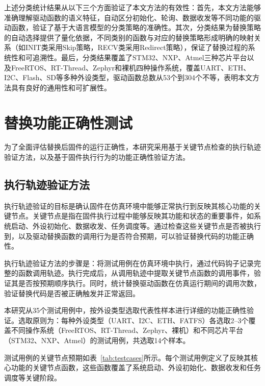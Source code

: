 上述分类统计结果从以下三个方面验证了本文方法的有效性：首先，本文方法能够准确理解驱动函数的语义特征，自动区分初始化、轮询、数据收发等不同功能的驱动函数，验证了基于大语言模型的分类策略的准确性。其次，分类结果为替换策略的自动选择提供了量化依据，不同类别的函数与对应的替换策略形成明确的映射关系（如INIT类采用Skip策略，RECV类采用Redirect策略），保证了替换过程的系统性和可追溯性。最后，分类结果覆盖了STM32、NXP、Atmel三种芯片平台以及FreeRTOS、RT-Thread、Zephyr和裸机四种操作系统，覆盖UART、ETH、I2C、Flash、SD等多种外设类型，驱动函数总数从53个到304个不等，表明本文方法具有良好的通用性和可扩展性。

\section{替换功能正确性测试}
\label{sec:correctness_test}

为了全面评估替换后固件的运行正确性，本研究采用基于关键节点检查的执行轨迹验证方法，以及基于固件执行行为的功能正确性验证方法。

\subsection{执行轨迹验证方法}

执行轨迹验证的目标是确认固件在仿真环境中能够正常执行到反映其核心功能的关键节点。关键节点是指在固件执行过程中能够反映其功能和状态的重要事件，如系统启动、外设初始化、数据收发、任务调度等。通过检查这些关键节点是否被执行到，以及驱动替换函数的调用行为是否符合预期，可以验证替换代码的功能正确性。

执行轨迹验证方法的步骤是：将测试用例在仿真环境中执行，通过代码钩子记录完整的函数调用轨迹。执行完成后，从调用轨迹中提取关键节点函数的调用事件，验证其是否按预期顺序执行。同时，统计替换驱动函数在仿真运行期间的调用次数，验证替换代码是否被正确触发并正常返回。

本研究从35个测试用例中，按外设类型选取代表性样本进行详细的功能正确性验证。选取原则为：每种外设类型（UART、I2C、ETH、FATFS）各选取2--3个覆盖不同操作系统（FreeRTOS、RT-Thread、Zephyr、裸机）和不同芯片平台（STM32、NXP、Atmel）的测试用例，共选取14个样本。

测试用例的关键节点预期如表~\ref{tab:testcases}所示。每个测试用例定义了反映其核心功能的关键节点函数，这些函数覆盖了系统启动、外设初始化、数据收发和任务调度等关键阶段。

